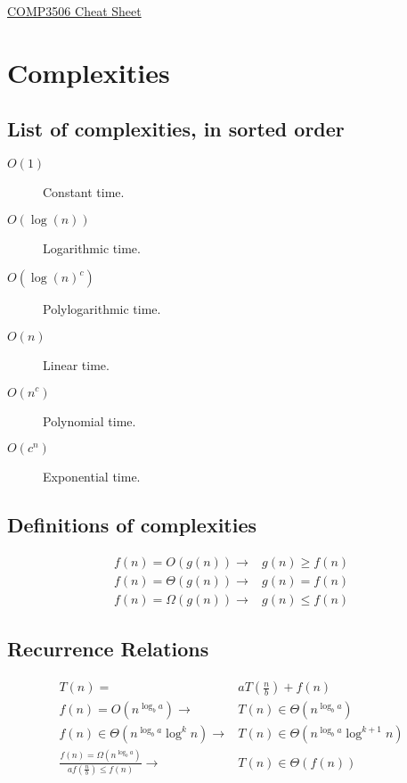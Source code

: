 \documentclass[landscape]{cheat}
\begin{document}
\footnotesize
\begin{multicols}{3}

\begin{center}
\Large{\underline{COMP3506 Cheat Sheet}} \\
\end{center}


\section{Complexities}

\subsection{List of complexities, in sorted order}
\begin{description}
    \item[$O(1)$] Constant time.
    \item[$O(\log(n))$] Logarithmic time.
    \item[$O(\log(n)^c)$] Polylogarithmic time.
    \item[$O(n)$] Linear time.
    \item[$O(n^c)$] Polynomial time.
    \item[$O(c^n)$] Exponential time.
\end{description}

\subsection{Definitions of complexities}
\begin{align*}
    f(n) = O(g(n)) \rightarrow& g(n) \geq f(n) \\
    f(n) = \Theta(g(n)) \rightarrow& g(n) = f(n) \\
    f(n) = \Omega(g(n)) \rightarrow& g(n) \leq f(n)
\end{align*}

\subsection{Recurrence Relations}
\begin{align*}
    T(n) =& a T(\frac n b) + f(n) \\
    f(n) = O(n^{\log_b a}) \rightarrow& T(n) \in \Theta(n^{\log_b a}) \\
    f(n) \in \Theta(n^{\log_b a} \log^k n) \rightarrow& T(n) \in \Theta(n^{\log_b a} \log^{k+1} n) \\
    \frac {f(n) = \Omega(n^{\log_b a})} {af(\frac n b) \leq f(n)} \rightarrow& T(n) \in \Theta(f(n)) \\
\end{align*}


\end{multicols}
\end{document}
